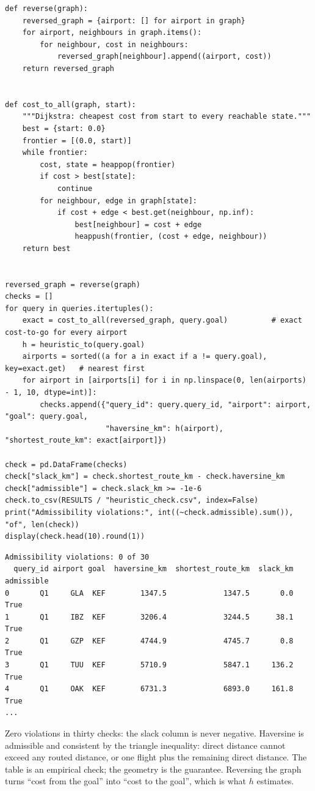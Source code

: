 \begin{labanswer}
\begin{lstlisting}[style=utppython]
def reverse(graph):
    reversed_graph = {airport: [] for airport in graph}
    for airport, neighbours in graph.items():
        for neighbour, cost in neighbours:
            reversed_graph[neighbour].append((airport, cost))
    return reversed_graph


def cost_to_all(graph, start):
    """Dijkstra: cheapest cost from start to every reachable state."""
    best = {start: 0.0}
    frontier = [(0.0, start)]
    while frontier:
        cost, state = heappop(frontier)
        if cost > best[state]:
            continue
        for neighbour, edge in graph[state]:
            if cost + edge < best.get(neighbour, np.inf):
                best[neighbour] = cost + edge
                heappush(frontier, (cost + edge, neighbour))
    return best


reversed_graph = reverse(graph)
checks = []
for query in queries.itertuples():
    exact = cost_to_all(reversed_graph, query.goal)          # exact cost-to-go for every airport
    h = heuristic_to(query.goal)
    airports = sorted((a for a in exact if a != query.goal), key=exact.get)   # nearest first
    for airport in [airports[i] for i in np.linspace(0, len(airports) - 1, 10, dtype=int)]:
        checks.append({"query_id": query.query_id, "airport": airport, "goal": query.goal,
                       "haversine_km": h(airport), "shortest_route_km": exact[airport]})

check = pd.DataFrame(checks)
check["slack_km"] = check.shortest_route_km - check.haversine_km
check["admissible"] = check.slack_km >= -1e-6
check.to_csv(RESULTS / "heuristic_check.csv", index=False)
print("Admissibility violations:", int((~check.admissible).sum()), "of", len(check))
display(check.head(10).round(1))
\end{lstlisting}
\expectedoutput
\begin{lstlisting}[style=utpterminal]
Admissibility violations: 0 of 30
  query_id airport goal  haversine_km  shortest_route_km  slack_km  admissible
0       Q1     GLA  KEF        1347.5             1347.5       0.0        True
1       Q1     IBZ  KEF        3206.4             3244.5      38.1        True
2       Q1     GZP  KEF        4744.9             4745.7       0.8        True
3       Q1     TUU  KEF        5710.9             5847.1     136.2        True
4       Q1     OAK  KEF        6731.3             6893.0     161.8        True
...
\end{lstlisting}
Zero violations in thirty checks: the slack column is never negative. Haversine is admissible and consistent by the triangle inequality: direct distance cannot exceed any routed distance, or one flight plus the remaining direct distance. The table is an empirical check; the geometry is the guarantee. Reversing the graph turns ``cost from the goal'' into ``cost to the goal'', which is what $h$ estimates.
\end{labanswer}


